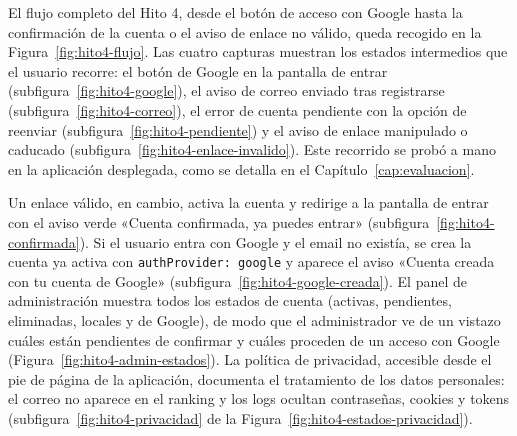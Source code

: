 El flujo completo del Hito 4, desde el botón de acceso con Google hasta la confirmación de la cuenta o el aviso de enlace no válido, queda recogido en la Figura~\ref{fig:hito4-flujo}. Las cuatro capturas muestran los estados intermedios que el usuario recorre: el botón de Google en la pantalla de entrar (subfigura~\ref{fig:hito4-google}), el aviso de correo enviado tras registrarse (subfigura~\ref{fig:hito4-correo}), el error de cuenta pendiente con la opción de reenviar (subfigura~\ref{fig:hito4-pendiente}) y el aviso de enlace manipulado o caducado (subfigura~\ref{fig:hito4-enlace-invalido}). Este recorrido se probó a mano en la aplicación desplegada, como se detalla en el Capítulo~\ref{cap:evaluacion}.

Un enlace válido, en cambio, activa la cuenta y redirige a la pantalla de entrar con el aviso verde «Cuenta confirmada, ya puedes entrar» (subfigura~\ref{fig:hito4-confirmada}). Si el usuario entra con Google y el email no existía, se crea la cuenta ya activa con \texttt{authProvider: google} y aparece el aviso «Cuenta creada con tu cuenta de Google» (subfigura~\ref{fig:hito4-google-creada}). El panel de administración muestra todos los estados de cuenta (activas, pendientes, eliminadas, locales y de Google), de modo que el administrador ve de un vistazo cuáles están pendientes de confirmar y cuáles proceden de un acceso con Google (Figura~\ref{fig:hito4-admin-estados}). La política de privacidad, accesible desde el pie de página de la aplicación, documenta el tratamiento de los datos personales: el correo no aparece en el ranking y los logs ocultan contraseñas, cookies y tokens (subfigura~\ref{fig:hito4-privacidad} de la Figura~\ref{fig:hito4-estados-privacidad}).

